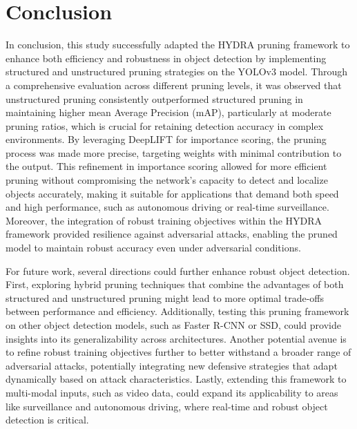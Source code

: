 \documentclass[journal,onecolumn,12pt]{IEEEtran}
\begin{document}
\section{Conclusion}

In conclusion, this study successfully adapted the HYDRA pruning framework to enhance both efficiency and robustness in object detection by implementing structured and unstructured pruning strategies on the YOLOv3 model. Through a comprehensive evaluation across different pruning levels, it was observed that unstructured pruning consistently outperformed structured pruning in maintaining higher mean Average Precision (mAP), particularly at moderate pruning ratios, which is crucial for retaining detection accuracy in complex environments. By leveraging DeepLIFT for importance scoring, the pruning process was made more precise, targeting weights with minimal contribution to the output. This refinement in importance scoring allowed for more efficient pruning without compromising the network's capacity to detect and localize objects accurately, making it suitable for applications that demand both speed and high performance, such as autonomous driving or real-time surveillance. Moreover, the integration of robust training objectives within the HYDRA framework provided resilience against adversarial attacks, enabling the pruned model to maintain robust accuracy even under adversarial conditions.

For future work, several directions could further enhance robust object detection. First, exploring hybrid pruning techniques that combine the advantages of both structured and unstructured pruning might lead to more optimal trade-offs between performance and efficiency. Additionally, testing this pruning framework on other object detection models, such as Faster R-CNN or SSD, could provide insights into its generalizability across architectures. Another potential avenue is to refine robust training objectives further to better withstand a broader range of adversarial attacks, potentially integrating new defensive strategies that adapt dynamically based on attack characteristics. Lastly, extending this framework to multi-modal inputs, such as video data, could expand its applicability to areas like surveillance and autonomous driving, where real-time and robust object detection is critical.



\end{document}
